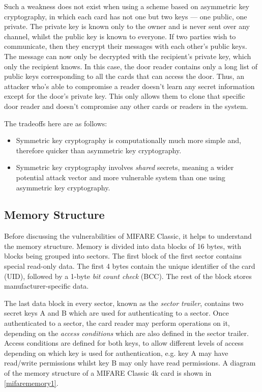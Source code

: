 \documentclass[12pt,a4paper,twoside,openright]{report}
\begin{document}
Such a weakness does not exist when using a scheme based on asymmetric key cryptography, in which each card has not one but two keys --- one public, one private. The private key is known only to the owner and is never sent over any channel, whilst the public key is known to everyone. If two parties wish to communicate, then they encrypt their messages with each other's public keys. The message can now only be decrypted with the recipient's private key, which only the recipient knows. In this case, the door reader contains only a long list of public keys corresponding to all the cards that can access the door. Thus, an attacker who's able to compromise a reader doesn't learn any secret information except for the door's private key. This only allows them to clone that specific door reader and doesn't compromise any other cards or readers in the system.

The tradeoffs here are as follows:

\begin{itemize}
\item Symmetric key cryptography is computationally much more simple and, therefore quicker than asymmetric key cryptography.
\item Symmetric key cryptography involves \emph{shared} secrets, meaning a wider potential attack vector and more vulnerable system than one using asymmetric key cryptography.
\end{itemize}

\subsection{Memory Structure}

Before discussing the vulnerabilities of MIFARE Classic, it helps to understand the memory structure. Memory is divided into data blocks of 16 bytes, with blocks being grouped into sectors. The first block of the first sector contains special read-only data. The first 4 bytes contain the unique identifier of the card (UID), followed by a 1-byte \emph{bit count check} (BCC). The rest of the block stores manufacturer-specific data.

The last data block in every sector, known as the \emph{sector trailer}, contains two secret keys A and B which are used for authenticating to a sector. Once authenticated to a sector, the card reader may perform operations on it, depending on the \emph{access conditions} which are also defined in the sector trailer. Access conditions are defined for both keys, to allow different levels of access depending on which key is used for authentication, e.g. key A may have read/write permissions whilst key B may only have read permissions. A diagram of the memory structure of a MIFARE Classic 4k card is shown in \autoref{mifarememory1}.
\end{document}
